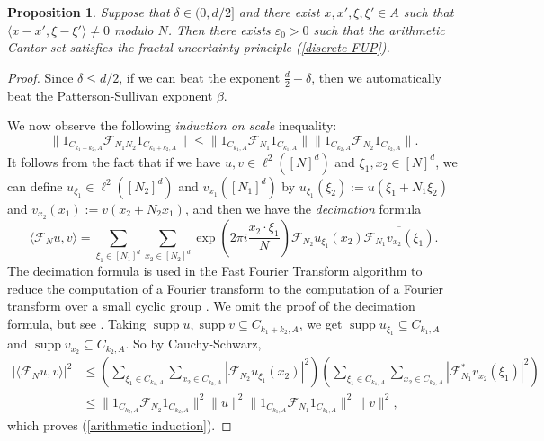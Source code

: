 \documentclass[reqno,12pt]{amsart}
\DeclareMathOperator{\supp}{supp}
\newcommand{\dfn}[1]{\emph{#1}\index{#1}}
\newtheorem{proposition}[theorem]{Proposition}
\theoremstyle{definition}
\numberwithin{equation}{section}
\begin{document}
\begin{proposition}
    Suppose that $\delta \in (0, d/2]$ and there exist $x, x', \xi, \xi' \in A$ such that $\langle x - x', \xi - \xi'\rangle \neq 0$ modulo $N$.
    Then there exists $\varepsilon_0 > 0$ such that the arithmetic Cantor set satisfies the fractal uncertainty principle (\ref{discrete FUP}).
\end{proposition}
\begin{proof}
Since $\delta \leq d/2$, if we can beat the exponent $\frac{d}{2} - \delta$, then we automatically beat the Patterson-Sullivan exponent $\beta$.

We now observe the following \dfn{induction on scale} inequality:
\begin{equation}\label{arithmetic induction}
    \|1_{C_{k_1 + k_2, A}} \mathcal F_{N_1 N_2} 1_{C_{k_1 + k_2, A}}\| \leq \|1_{C_{k_1, A}} \mathcal F_{N_1} 1_{C_{k_1, A}}\| \|1_{C_{k_2, A}} \mathcal F_{N_2} 1_{C_{k_2, A}}\|.
\end{equation}
It follows from the fact that if we have $u, v \in \ell^2([N]^d)$ and $\xi_1, x_2 \in [N]^d$, we can define $u_{\xi_1} \in \ell^2([N_2]^d)$ and $v_{x_1}([N_1]^d)$ by $u_{\xi_1}(\xi_2) := u(\xi_1 + N_1 \xi_2)$ and $v_{x_2}(x_1) := v(x_2 + N_2 x_1)$, and then we have the \dfn{decimation} formula
$$\langle \mathcal F_N u, v\rangle = \sum_{\xi_1 \in [N_1]^d} \sum_{x_2 \in [N_2]^d} \exp\left(2\pi i \frac{x_2 \cdot \xi_1}{N}\right) \mathcal F_{N_2} u_{\xi_1}(x_2) \overline{\mathcal F_{N_1} v_{x_2}(\xi_1)}.$$
The decimation formula is used in the Fast Fourier Transform algorithm to reduce the computation of a Fourier transform to the computation of a Fourier transform over a small cyclic group \cite[Chapter 2]{DBLP:books/daglib/0017733}.
We omit the proof of the decimation formula, but see \cite[Lemma 3.1]{Dyatlov_2017}.
Taking $\supp u, \supp v \subseteq C_{k_1 + k_2, A}$, we get $\supp u_{\xi_1} \subseteq C_{k_1, A}$ and $\supp v_{x_2} \subseteq C_{k_2, A}$. So by Cauchy-Schwarz,
\begin{align*}
    |\langle \mathcal F_N u, v\rangle|^2
    &\leq \left(\sum_{\xi_1 \in C_{k_1, A}} \sum_{x_2 \in C_{k_2, A}} |\mathcal F_{N_2} u_{\xi_1}(x_2)|^2\right) \left(\sum_{\xi_1 \in C_{k_1, A}} \sum_{x_2 \in C_{k_2, A}} |\mathcal F_{N_1}^* v_{x_2}(\xi_1)|^2\right) \\
    &\leq \|1_{C_{k_2, A}} \mathcal F_{N_2} 1_{C_{k_2, A}}\|^2 \|u\|^2 \|1_{C_{k_1, A}} \mathcal F_{N_1} 1_{C_{k_1, A}}\|^2 \|v\|^2,
\end{align*}
which proves (\ref{arithmetic induction}).


\end{proof}
\end{document}
